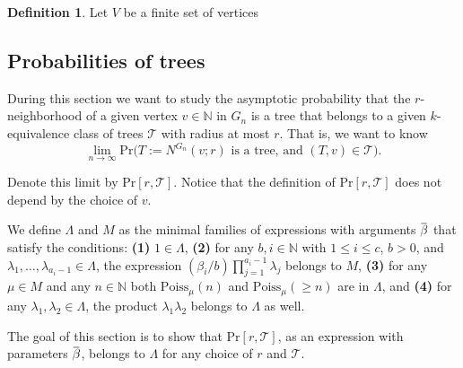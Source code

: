 \documentclass[12pt,notitlepage,a4paper]{article}
\theoremstyle{definition}
\newtheorem{definition}{Definition}[section]
\newcommand{\N}{\mathbb{N}}
\newcommand{\Ln}{\lim\limits_{n\to \infty}}
\newcommand{\overbar}[1]{\mkern 1.5mu\overline{\mkern-1.5mu#1\mkern-1.5mu}\mkern 1.5mu}
\begin{document}
\begin{definition} 
	Let $V$ be a finite set of vertices 
	
	
\end{definition}
	








\subsection{Probabilities of trees}

During this section we want to study
the asymptotic probability that the 
$r$-neighborhood of a given vertex $v\in \N$
in $G_n$ 
is a tree that belongs to a given $k$-equivalence
class of trees $\mathcal{T}$ with radius at most
$r$. That is, we want to know
\[\Ln \mathrm{Pr}\big( 
T:=N^{G_n}(v;r) \text{ is a tree, and } (T,v)\in \mathcal{T} \big). 
\]

Denote this limit by $\mathrm{Pr}[r,\mathcal{T}]$. Notice that the 
definition of  $\mathrm{Pr}[r,\mathcal{T}]$ does not depend by the
choice of $v$.\par

We define $\Lambda$ and $M$ as the minimal families
of expressions with arguments $\overbar{\beta}$ that satisfy
 the conditions: \textbf{(1)} $1\in \Lambda$, \textbf{(2)} 
for any $b,i\in \N$ with $1\leq i \leq c$,
$b > 0$, and $\lambda_1,\dots, \lambda_{a_i-1}\in \Lambda$,
the expression $(\beta_i/b) \prod_{j=1}^{a_i-1}\lambda_j$
belongs to $M$,  \textbf{(3)}
for any $\mu\in M$ and any $n\in \N$ both
$\mathrm{Poiss}_{\mu}(n)$ and $\mathrm{Poiss}_\mu(\geq n)$ are in $\Lambda$, 
and  \textbf{(4)} for any $\lambda_1,\lambda_2 \in \Lambda$, the
product $\lambda_1\lambda_2$ belongs to $\Lambda$ as well.
\par
The goal of this section is to show 
that $\mathrm{Pr}[r,\mathcal{T}]$,
as an expression with parameters
$\overbar{\beta}$, belongs to $\Lambda$ for any choice of 
$r$ and $\mathcal{T}$. \par
\end{document}
